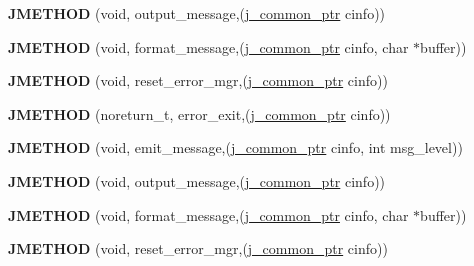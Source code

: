 \begin{DoxyCompactItemize}
\mbox{\label{structjpeg__error__mgr_ac2989f8ef34acdd78ce26a9110a1c094}} 
{\bfseries J\+M\+E\+T\+H\+OD} (void, output\+\_\+message,(\hyperlink{structjpeg__common__struct}{j\+\_\+common\+\_\+ptr} cinfo))
\item 
\mbox{\label{structjpeg__error__mgr_a5f1dfb51c337c36ae1bc5fae7f84528f}} 
{\bfseries J\+M\+E\+T\+H\+OD} (void, format\+\_\+message,(\hyperlink{structjpeg__common__struct}{j\+\_\+common\+\_\+ptr} cinfo, char $\ast$buffer))
\item 
\mbox{\label{structjpeg__error__mgr_ac676478083167b3731995d7901bd4b6c}} 
{\bfseries J\+M\+E\+T\+H\+OD} (void, reset\+\_\+error\+\_\+mgr,(\hyperlink{structjpeg__common__struct}{j\+\_\+common\+\_\+ptr} cinfo))
\item 
\mbox{\label{structjpeg__error__mgr_a72c40bceda2e6cb78046165e6892ac3a}} 
{\bfseries J\+M\+E\+T\+H\+OD} (noreturn\+\_\+t, error\+\_\+exit,(\hyperlink{structjpeg__common__struct}{j\+\_\+common\+\_\+ptr} cinfo))
\item 
\mbox{\label{structjpeg__error__mgr_a73c0a027b6e6cb8ff2b7b0fc42f756f9}} 
{\bfseries J\+M\+E\+T\+H\+OD} (void, emit\+\_\+message,(\hyperlink{structjpeg__common__struct}{j\+\_\+common\+\_\+ptr} cinfo, int msg\+\_\+level))
\item 
\mbox{\label{structjpeg__error__mgr_ac2989f8ef34acdd78ce26a9110a1c094}} 
{\bfseries J\+M\+E\+T\+H\+OD} (void, output\+\_\+message,(\hyperlink{structjpeg__common__struct}{j\+\_\+common\+\_\+ptr} cinfo))
\item 
\mbox{\label{structjpeg__error__mgr_a5f1dfb51c337c36ae1bc5fae7f84528f}} 
{\bfseries J\+M\+E\+T\+H\+OD} (void, format\+\_\+message,(\hyperlink{structjpeg__common__struct}{j\+\_\+common\+\_\+ptr} cinfo, char $\ast$buffer))
\item 
\mbox{\label{structjpeg__error__mgr_ac676478083167b3731995d7901bd4b6c}} 
{\bfseries J\+M\+E\+T\+H\+OD} (void, reset\+\_\+error\+\_\+mgr,(\hyperlink{structjpeg__common__struct}{j\+\_\+common\+\_\+ptr} cinfo))
\item 

\end{DoxyCompactItemize}
